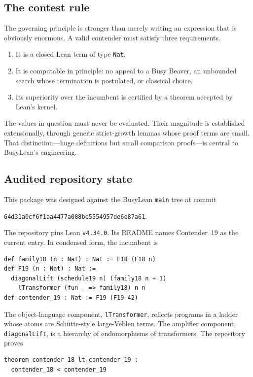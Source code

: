 \documentclass[11pt]{article}
\theoremstyle{definition}
\theoremstyle{remark}
\newcommand{\lean}[1]{\nolinkurl{#1}}
\begin{document}
\subsection{The contest rule}

The governing principle is stronger than merely writing an expression that is
obviously enormous. A valid contender must satisfy three requirements.

\begin{enumerate}[leftmargin=*]
\item It is a closed Lean term of type \lean{Nat}.
\item It is computable in principle: no appeal to a Busy Beaver, an unbounded
  search whose termination is postulated, or classical choice.
\item Its superiority over the incumbent is certified by a theorem accepted by
  Lean's kernel.
\end{enumerate}

The values in question must never be evaluated. Their magnitude is established
extensionally, through generic strict-growth lemmas whose proof terms are small.
That distinction---huge definitions but small comparison proofs---is central to
BusyLean's engineering.

\subsection{Audited repository state}

This package was designed against the BusyLean \lean{main} tree at commit
\begin{center}
\small\lean{64d31a0cf6f1aa4477a088be5554957de6e87a61}.
\end{center}
The repository pins Lean \lean{v4.34.0}. Its README names Contender~19 as the
current entry. In condensed form, the incumbent is

\begin{lstlisting}
def family18 (n : Nat) : Nat := F18 (F18 n)
def F19 (n : Nat) : Nat :=
  diagonalLift (schedule19 n) (family18 n + 1)
    lTransformer (fun _ => family18) n n
def contender_19 : Nat := F19 (F19 42)
\end{lstlisting}

The object-language component, \lean{lTransformer}, reflects programs in a
ladder whose atoms are Sch\"utte-style large-Veblen terms. The amplifier
component, \lean{diagonalLift}, is a hierarchy of endomorphisms of transformers.
The repository proves

\begin{lstlisting}
theorem contender_18_lt_contender_19 :
  contender_18 < contender_19
\end{lstlisting}
\end{document}
